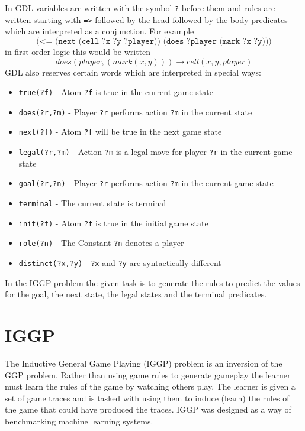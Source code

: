 In GDL variables are written with the symbol \texttt{?} before them and rules are written starting with \verb|=>| followed by the head followed by the body predicates which are interpreted as a conjunction. For example \[\texttt{(<= (next (cell ?x ?y ?player)) (does ?player (mark ?x ?y)))}\] in first order logic this would be written \[does(player,(mark(x,y))) \rightarrow cell(x,y,player)\]
GDL also reserves certain words which are interpreted in special ways:
\begin{itemize}
	\item \texttt{true(?f)} - Atom \texttt{?f} is true in the current game state
	\item \texttt{does(?r,?m)} - Player \texttt{?r} performs action \texttt{?m} in the current state
	\item \texttt{next(?f)} - Atom \texttt{?f} will be true in the next game state
	\item \texttt{legal(?r,?m)} - Action \texttt{?m} is a legal move for player \texttt{?r} in the current game state
	\item \texttt{goal(?r,?n)} - Player \texttt{?r} performs action \texttt{?m} in the current game state
	\item \texttt{terminal} - The current state is terminal
	\item \texttt{init(?f)} - Atom \texttt{?f} is true in the initial game state
	\item \texttt{role(?n)} - The Constant \texttt{?n} denotes a player
	\item \texttt{distinct(?x,?y)} - \texttt{?x} and \texttt{?y} are syntactically different
\end{itemize}
In the IGGP problem the given task is to generate the rules to predict the values for the goal, the next state, the legal states and the terminal predicates.



\section{IGGP}
The Inductive General Game Playing (IGGP) problem is an inversion of the GGP problem. Rather than using game rules to generate gameplay the learner must learn the rules of the game by watching others play. The learner is given a set of game traces and is tasked with using them to induce (learn) the rules of the game that could have produced the traces\cite{Cropper/IGGP}. IGGP was designed as a way of benchmarking machine learning systems.

